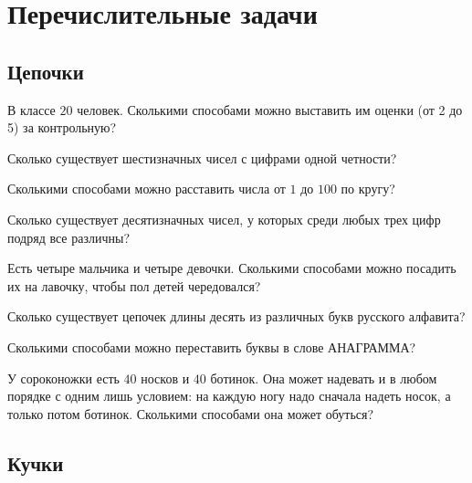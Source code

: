

\section*{Перечислительные задачи}


\subsection*{Цепочки}

\begin{problems}

\item
В классе $20$ человек.
Сколькими способами можно выставить им оценки (от 2 до 5) за контрольную?

\item
Сколько существует шестизначных чисел с цифрами одной четности?

\item
Сколькими способами можно расставить числа от $1$ до $100$ по кругу?

\item
Сколько существует десятизначных чисел, у которых среди любых трех цифр подряд
все различны?

\item
Есть четыре мальчика и четыре девочки.
Сколькими способами можно посадить их на лавочку, чтобы пол детей чередовался?

\item
Сколько существует цепочек длины десять из различных букв русского алфавита?

\item
Сколькими способами можно переставить буквы в слове АНАГРАММА?

\item
У сороконожки есть $40$ носков и $40$ ботинок.
Она может надевать и в любом порядке с одним лишь условием: на каждую ногу надо
сначала надеть носок, а только потом ботинок.
Сколькими способами она может обуться? 

\end{problems}


\subsection*{Кучки}

